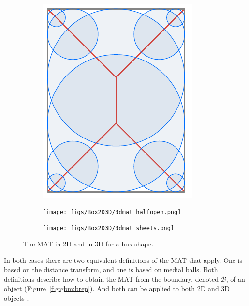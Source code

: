 \begin{figure}
	\centering
	\begin{subfigure}{0.26\linewidth}
		\includegraphics[width=\linewidth]{figs/Box2D3D/3dmat_2d.pdf}
		\label{fig:3dmat_2d}
	\end{subfigure}
	\quad
	\begin{subfigure}{0.33\linewidth}
		\texttt{[image: figs/Box2D3D/3dmat\_halfopen.png]}
		\label{fig:3dmat_halfopen}
	\end{subfigure}
	\quad
	\begin{subfigure}{0.33\linewidth}
		\texttt{[image: figs/Box2D3D/3dmat\_sheets.png]}
		\label{fig:3dmat_sheets}
	\end{subfigure}
	\caption{The MAT in 2D and in 3D for a box shape.}
	\label{fig:3dmat}
\end{figure}
In both cases there are two equivalent definitions of the MAT that apply. 
One is based on the distance transform, and one is based on medial balls. 
Both definitions describe how to obtain the MAT from the boundary, denoted $
\mathcal{B}$, of an object (Figure~\ref{fig:gbm:brep}).
And both can be applied to both 2D and 3D objects .

